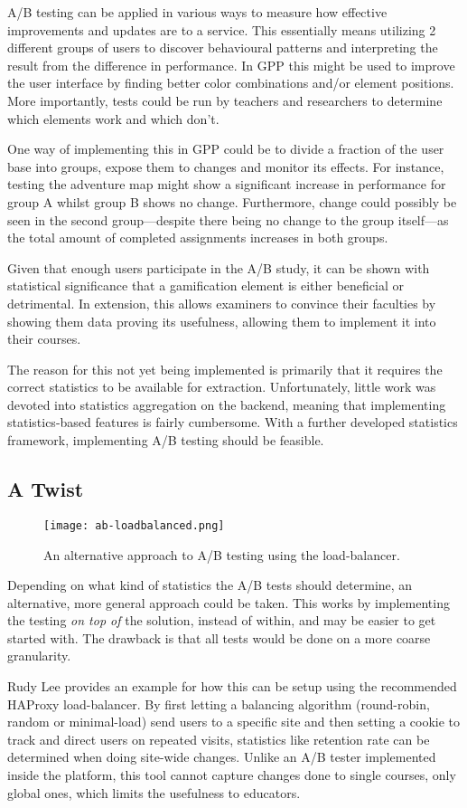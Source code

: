 A/B testing can be applied in various ways to measure how effective improvements and updates are to a service. This essentially means utilizing 2 different groups of users to discover behavioural patterns and interpreting the result from the difference in performance. In GPP this might be used to improve the user interface by finding better color combinations and/or element positions. More importantly, tests could be run by teachers and researchers to determine which elements work and which don't.

One way of implementing this in GPP could be to divide a fraction of the user base into groups, expose them to changes and monitor its effects. For instance, testing the adventure map might show a significant increase in performance for group A whilst group B shows no change. Furthermore, change could possibly be seen in the second group---despite there being no change to the group itself---as the total amount of completed assignments increases in both groups.

Given that enough users participate in the A/B study, it can be shown with statistical significance that a gamification element is either beneficial or detrimental. In extension, this allows examiners to convince their faculties by showing them data proving its usefulness, allowing them to implement it into their courses.

The reason for this not yet being implemented is primarily that it requires the correct statistics to be available for extraction. Unfortunately, little work was devoted into statistics aggregation on the backend, meaning that implementing statistics-based features is fairly cumbersome. With a further developed statistics framework, implementing A/B testing should be feasible.

\subsection{A Twist}
\begin{wrapfigure}[14]{r}{6cm}
    \centering
    \texttt{[image: ab-loadbalanced.png]}
    \caption{An alternative approach to A/B testing using the load-balancer.}
\end{wrapfigure}
Depending on what kind of statistics the A/B tests should determine, an alternative, more general approach could be taken. This works by implementing the testing \textit{on top of} the solution, instead of within, and may be easier to get started with. The drawback is that all tests would be done on a more coarse granularity.

Rudy Lee provides an example\cite{rudylee} for how this can be setup using the recommended HAProxy load-balancer. By first letting a balancing algorithm (round-robin, random or minimal-load) send users to a specific site and then setting a cookie to track and direct users on repeated visits, statistics like retention rate can be determined when doing site-wide changes. Unlike an A/B tester implemented inside the platform, this tool cannot capture changes done to single courses, only global ones, which limits the usefulness to educators.
